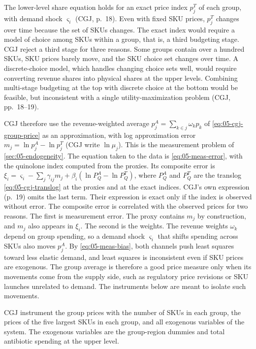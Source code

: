  The lower-level share equation holds for an exact price index $p_j^T$ of each
group, with demand shock $\varsigma_i$ (CGJ, p.~18). Even with fixed SKU prices, $p_j^T$ changes over time because
the set of SKUs changes. The exact index would require a model of choice among SKUs within a group, that is, a third
budgeting stage. CGJ reject a third stage for three reasons. Some groups contain over a hundred SKUs, SKU prices
barely move, and the SKU choice set changes over time. A discrete-choice model, which handles changing choice sets
well, would require converting revenue shares into physical shares at the upper levels. Combining multi-stage
budgeting at the top with discrete choice at the bottom would be feasible, but inconsistent with a single
utility-maximization problem (CGJ, pp.~18--19).

CGJ therefore use the revenue-weighted average $p_j^A = \sum_{k\in j}\omega_kp_k$ of \eqref{eq:05-cgj-group-price} as
an approximation, with log approximation error $m_j = \ln p_j^A - \ln p_j^T$ (CGJ write $\ln\mu_j$). This is the
measurement problem of \cref{sec:05-endogeneity}. The equation taken to the data is \eqref{eq:05-meas-error}, with
the quinolone index computed from the proxies. Its composite error is $\xi_i = \varsigma_i - \sum_j\gamma_{ij}m_j +
\beta_i(\ln P_Q^A - \ln P_Q^T)$, where $P_Q^A$ and $P_Q^T$ are the translog \eqref{eq:05-cgj-translog} at the proxies
and at the exact indices. CGJ's own expression (p.~19) omits the last term. Their expression is exact only if the index is
observed without error. The composite error is correlated with the observed prices for two reasons. The first is
measurement error. The proxy contains $m_j$ by construction, and $m_j$ also appears in $\xi_i$. The
second is the weights. The revenue weights $\omega_k$ depend on group spending, so a demand shock $\varsigma_i$ that
shifts spending across SKUs also moves $p_j^A$. By \eqref{eq:05-meas-bias}, both channels push least squares toward
less elastic demand, and least squares is inconsistent even if SKU prices are exogenous. The group average is
therefore a good price measure only when its movements come from the supply side, such as regulatory price revisions
or SKU launches unrelated to demand. The instruments below are meant to isolate such movements.

 CGJ instrument the group prices with the number of SKUs in each group, the prices of the
five largest SKUs in each group, and all exogenous variables of the system. The exogenous variables are the
group-region dummies and total antibiotic spending at the upper level.

